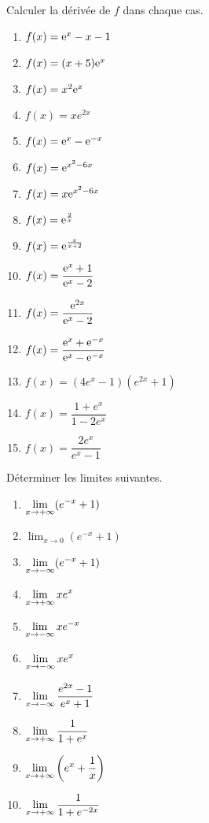   \begin{exercice}
 Calculer la dérivée de  $ f $  dans chaque cas.
 
\begin{enumerate}
\item $ f(x)=\mathrm{e}^{x}-x-1 $ 
\item $ f(x)= (x+5)\mathrm{e}^{x}$  
\item $f(x)= x^{2}\mathrm{e}^{x} $  
\item $ f(x)= xe^{2x} $ 
\item  $f(x)= \mathrm{e}^{x}-\mathrm{e}^{-x}  $  
 \item $ f(x)= \mathrm{e}^{x^{2}-6x}$ 
  \item $ f(x)= x\mathrm{e}^{x^{2}-6x}$
   \item $ f(x)= \mathrm{e}^{\frac{2}{x}}$ 
   \item  $f(x)=\mathrm{e}^{\frac{x}{x+2}} $  
   \item $ f(x)=\dfrac{\mathrm{e}^{x}+1}{\mathrm{e}^{x}-2} $
   \item $ f(x)=\dfrac{\mathrm{e}^{2x}}{\mathrm{e}^{x}-2} $
   \item $ f(x)=\dfrac{\mathrm{e}^{x}+\mathrm{e}^{-x}}{\mathrm{e}^{x}-\mathrm{e}^{-x}} $
   \item $ f(x)= (4e^{x}-1)(e^{2x}+1) $
   \item $ f(x)= \dfrac{1+e^{x}}{1-2e^{x}} $ 
   \item $ f(x)= \dfrac{2e^{x}}{e^{x}-1} $
\end{enumerate}

 \end{exercice}
 
  \begin{exercice}
 
 
  Déterminer les limites suivantes.
 
  \begin{enumerate}
   \item $ \displaystyle\lim_{x \to +\infty} (e^{-x}+1)  $ \item $ \displaystyle\lim_{x \to 0}( e^{-x}+1)  $ \item $ \displaystyle\lim_{x \to -\infty}( e^{-x}+1)  $ \item $ \displaystyle\lim_{x \to +\infty} xe^{x}  $ \item $ \displaystyle\lim_{x \to -\infty}x e^{-x}  $ \item $\displaystyle \lim_{x \to -\infty}x e^{x}  $ \item $ \displaystyle \lim_{x \to -\infty} \dfrac{e^{2x}-1}{e^{x}+1}  $ \item $\displaystyle \lim_{x \to +\infty} \dfrac{1}{1+e^{x}} $\item $\displaystyle \lim_{x \to +\infty}\left( e^{x} +\dfrac{1}{x}\right) $ \item $\displaystyle \lim_{x \to +\infty} \dfrac{1}{1+e^{-2x}}  $ 
 \end{enumerate}

 \end{exercice}
 
